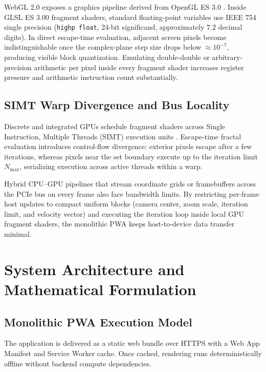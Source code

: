 \documentclass[11pt, a4paper]{article}
\begin{document}
WebGL 2.0 exposes a graphics pipeline derived from OpenGL ES 3.0 \cite{khronoswebgl2}. Inside GLSL ES 3.00 fragment shaders, standard floating-point variables use IEEE 754 single precision (\texttt{highp float}, 24-bit significand, approximately $7.2$ decimal digits). In direct escape-time evaluation, adjacent screen pixels become indistinguishable once the complex-plane step size drops below $\approx 10^{-7}$, producing visible block quantization. Emulating double-double or arbitrary-precision arithmetic per pixel inside every fragment shader increases register pressure and arithmetic instruction count substantially.

\subsection{SIMT Warp Divergence and Bus Locality}

Discrete and integrated GPUs schedule fragment shaders across Single Instruction, Multiple Threads (SIMT) execution units \cite{hennessy2011computer}. Escape-time fractal evaluation introduces control-flow divergence: exterior pixels escape after a few iterations, whereas pixels near the set boundary execute up to the iteration limit $N_{\max}$, serializing execution across active threads within a warp.

Hybrid CPU--GPU pipelines that stream coordinate grids or framebuffers across the PCIe bus on every frame also face bandwidth limits. By restricting per-frame host updates to compact uniform blocks (camera center, zoom scale, iteration limit, and velocity vector) and executing the iteration loop inside local GPU fragment shaders, the monolithic PWA keeps host-to-device data transfer minimal.

\section{System Architecture and Mathematical Formulation}

\subsection{Monolithic PWA Execution Model}

The application is delivered as a static web bundle over HTTPS with a Web App Manifest and Service Worker cache. Once cached, rendering runs deterministically offline without backend compute dependencies.
\end{document}
